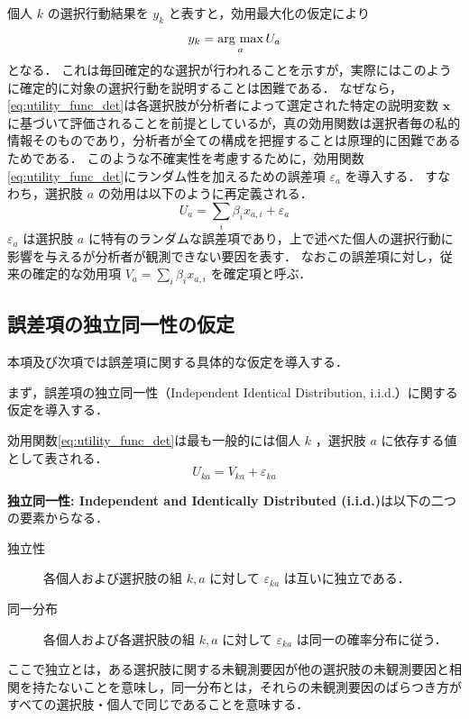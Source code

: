個人 $k$ の選択行動結果を $y_k$ と表すと，効用最大化の仮定により
\begin{equation}\label{eq:utility_max}
y_k = \argmax_{a} U_{a}
\end{equation}
となる．
これは毎回確定的な選択が行われることを示すが，実際にはこのように確定的に対象の選択行動を説明することは困難である．
なぜなら，\eqref{eq:utility_func_det}は各選択肢が分析者によって選定された特定の説明変数 $\bm{x}$ に基づいて評価されることを前提としているが，真の効用関数は選択者毎の私的情報そのものであり，分析者が全ての構成を把握することは原理的に困難であるためである．
このような不確実性を考慮するために，効用関数\eqref{eq:utility_func_det}にランダム性を加えるための誤差項 $\varepsilon_a$ を導入する．
すなわち，選択肢 $a$ の効用は以下のように再定義される．
\begin{equation}\label{eq:utility_func_random}
U_{a} = \sum_{i} \beta_{i} x_{a, i} + \varepsilon_a
\end{equation}
$\varepsilon_a$ は選択肢 $a$ に特有のランダムな誤差項であり，上で述べた個人の選択行動に影響を与えるが分析者が観測できない要因を表す．
なおこの誤差項に対し，従来の確定的な効用項 $V_a = \sum_i \beta_i x_{a, i}$ を確定項と呼ぶ．


\subsection{誤差項の独立同一性の仮定}\label{ssec:iid_assumption}
本項及び次項では誤差項に関する具体的な仮定を導入する．

まず，誤差項の独立同一性（Independent Identical Distribution, i.i.d.）に関する仮定を導入する．

効用関数\eqref{eq:utility_func_det}は最も一般的には個人 $k$ ，選択肢 $a$ に依存する値として表される．
\begin{equation}
U_{ka} = V_{ka} + \varepsilon_{ka}
\end{equation}

\textbf{独立同一性: Independent and Identically Distributed (i.i.d.)}は以下の二つの要素からなる．
\begin{description}
  \item[独立性] 各個人および選択肢の組 $k, a$ に対して $\varepsilon_{ka}$ は互いに独立である．
  \item[同一分布] 各個人および各選択肢の組 $k, a$ に対して $\varepsilon_{ka}$ は同一の確率分布に従う．
\end{description}
ここで独立とは，ある選択肢に関する未観測要因が他の選択肢の未観測要因と相関を持たないことを意味し，同一分布とは，それらの未観測要因のばらつき方がすべての選択肢・個人で同じであることを意味する．

